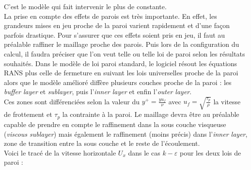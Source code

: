 \documentclass[a4paper,10pt]{article}
\newcommand{\keps}{$k-\varepsilon$}
\begin{document}
\noindent C'est le modèle qui fait intervenir le plus de constante. \\ 
\indent La prise en compte des effets de parois est très importante. En effet, les grandeurs mises en jeu proche de la paroi varient rapidement et d'une façon parfois drastique. Pour s'assurer que ces effets soient pris en jeu, il faut au préalable raffiner le maillage proche des parois. Puis lors de la configuration du calcul, il faudra préciser que l'on veut telle ou telle loi de paroi selon les résultats souhaités. Dans le modèle de loi paroi standard, le logiciel résout les équations RANS plus celle de fermeture en suivant les lois universelles proche de la paroi alors que le modèle amélioré diffère plusieurs couches proche de la paroi : les \textit{buffer layer} et \textit{sublayer}, puis  l'\textit{inner layer }et enfin l'\textit{outer layer}.\\
Ces zones sont différenciées selon la valeur du $y^+ = \frac{yu_f}{\nu}$ avec $u_f = \sqrt{\frac{\tau_p}{\rho}}$ la vitesse de frottement et $\tau_p$ la contrainte à la paroi. Le maillage devra être au préalable capable de prendre en compte le raffinement dans la sous couche visqueuse (\textit{viscous sublayer}) mais également le raffinement (moins précis) dans l'\textit{inner layer}, zone de transition entre la sous couche et le reste de l'écoulement.\\
Voici le tracé de la vitesse horizontale $U_x$ dans le cas \keps $ $ pour les deux lois de paroi :
 
\end{document}
